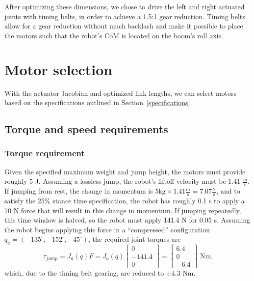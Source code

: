 \documentclass{report}
\begin{document}
After optimizing these dimensions, we chose to drive the left and right actuated joints with timing belts, in order to achieve a 1.5:1 gear reduction. Timing belts allow for a gear reduction without much backlash and make it possible to place the motors such that the robot's CoM is located on the boom's roll axis.

\section[Motor selection]{Motor selection}
With the actuator Jacobian and optimized link lengths, we can select motors based on the specifications outlined in Section~\ref{specifications}.
\subsection[Torque and speed requirements]{Torque and speed requirements}
\subsubsection[Torque requirement]{Torque requirement}
Given the specified maximum weight and jump height, the motors must provide roughly 5 J. Assuming a lossless jump, the robot's liftoff velocity must be 1.41 $\frac{\text{m}}{\text{s}}$. If jumping from rest, the change in momentum is $5 \text{kg} \times 1.41 \frac{\text{m}}{\text{s}} = 7.07 \frac{\text{N}}{\text{s}}$, and to satisfy the 25\% stance time specification, the robot has roughly 0.1 s to apply a 70 N force that will result in this change in momentum. If jumping repeatedly, this time window is halved, so the robot must apply 141.4 N for 0.05 s. Assuming the robot begins applying this force in a ``compressed'' configuration $q_{a} = \left(-135^{\circ},-152^{\circ},-45^{\circ}\right)$, the required joint torques are
\begin{equation}
\tau_{jump} = J_{a}(q)F = J_{a}(q)\begin{bmatrix}
0\\
-141.4\\
0
\end{bmatrix}
= \begin{bmatrix}
6.4\\
0\\
-6.4
\end{bmatrix}\text{ Nm,}
\end{equation}
which, due to the timing belt gearing, are reduced to $\pm 4.3 \text{ Nm}$.
\end{document}
